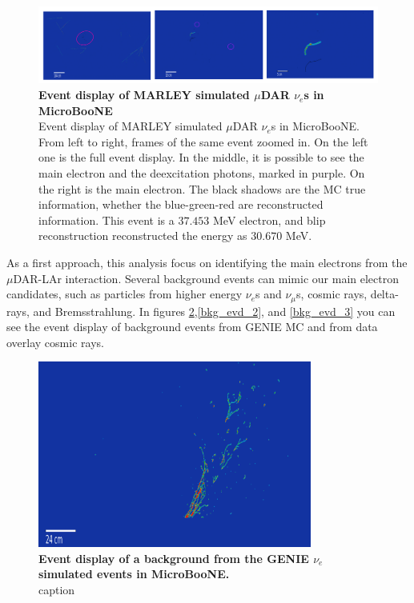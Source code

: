 \begin{figure}[h!]
    \centering
    \includegraphics[width=\textwidth]{Figures/signal_evd_3.jpeg}
    \caption[Event display of MARLEY simulated $\mu$DAR $\nu_e$s in MicroBooNE]{{\textbf{Event display of MARLEY simulated $\mu$DAR $\nu_e$s in MicroBooNE}}\\ Event display of MARLEY simulated $\mu$DAR $\nu_e$s in MicroBooNE. From left to right, frames of the same event zoomed in. On the left one is the full event display. In the middle, it is possible to see the main electron and the deexcitation photons, marked in purple. On the right is the main electron. The black shadows are the MC true information, whether the blue-green-red are reconstructed information. This event is a $37.453$ MeV electron, and blip reconstruction reconstructed the energy as $30.670$ MeV.}
 \label{signal_evd_3}
\end{figure}

As a first approach, this analysis focus on identifying the main electrons from the $\mu$DAR-LAr interaction. 
Several background events can mimic our main electron candidates, such as particles from higher energy $\nu_e$s and $\nu_{\mu}$s, cosmic rays, delta-rays, and Bremsstrahlung. In figures \ref{bkg_evd_1},\ref{bkg_evd_2}, and \ref{bkg_evd_3} you can see the event display of background events from GENIE MC and from data overlay cosmic rays.


\begin{figure}[h!]
    \centering
    \includegraphics[width=90mm]{Figures/shower_evd_1.png}
    \caption[Event display of a background from the GENIE $\nu_{mu}$ simulated events in MicroBooNE.]{{\textbf{Event display of a background from the GENIE $\nu_{e}$ simulated events in MicroBooNE.}}\\ caption }
    \label{bkg_evd_1}
\end{figure}

